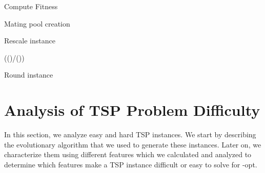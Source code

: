 \documentclass{article}
\begin{document}
\begin{algorithm}
  \caption{Compute Fitness}
  \label{alg:uniform_crossover}
  \begin{algorithmic}
    \State 
    \For{}
    \State 
    \EndFor
    \State \Return 
    \EndFunction
  \end{algorithmic}
\end{algorithm}

\begin{algorithm}
  \caption{Mating pool creation}
  \label{alg:matingPool}
  \begin{algorithmic}
    \For{}
    \State 
    \State 
    \EndFor
    \State \Return 
    \EndFunction
  \end{algorithmic}
\end{algorithm}

\begin{algorithm}
  \caption{Rescale instance}
  \label{alg:rescale}
  \begin{algorithmic}
    \State   {}
    \State   {}
    \State   (()/())
    \State \Return 
    \EndFunction
  \end{algorithmic}
\end{algorithm}

\begin{algorithm}[h]
  \caption{Round instance}
  \label{alg:round}
  \begin{algorithmic}
    \State 
    \State 
    \For{}
    \State 
    \EndFor
    \State \Return 
    \EndFunction
  \end{algorithmic}
\end{algorithm}

\section{Analysis of TSP Problem Difficulty}\label{sec3}

In this section, we analyze easy and hard TSP instances. We start by
describing the evolutionary algorithm that we used to generate these
instances. Later on, we characterize them using different features
which we calculated and analyzed to determine which features make a
TSP instance difficult or easy to solve for -opt.
\end{document}

